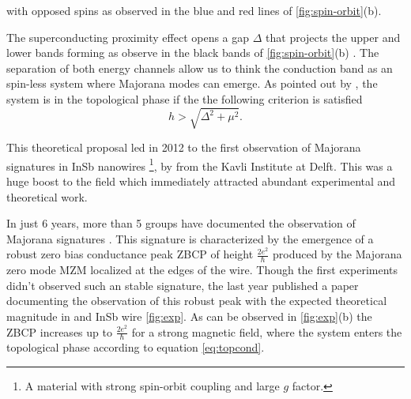 \noindent with opposed spins as observed in the blue and red lines of \ref{fig:spin-orbit}(b).  

The superconducting proximity effect opens a gap $\Delta$ that projects the upper and lower bands forming as observe in the black bands of \ref{fig:spin-orbit}(b) . The separation of both energy channels allow us to think the conduction band as an spin-less system where Majorana modes can emerge. As pointed out by \citeauthor{alicea_new_2012}, the system is in the topological phase if the the following criterion is satisfied 
\begin{equation}
  h > \sqrt{\Delta^2 +\mu^2 }. 
  \label{eq:topcond}
\end{equation}


This theoretical proposal led in 2012 to the first observation of Majorana signatures in InSb nanowires \footnote{A material with strong spin-orbit coupling and large $g$ factor.}, by \citeauthor{mourik_signatures_2012} from the Kavli Institute at Delft. This was a huge boost to the field which immediately attracted abundant experimental and theoretical work. 

In just 6 years, more than 5 groups have documented the observation of Majorana signatures \cite{das_zero-bias_2012,deng_anomalous_2012,nadj-perge_observation_2014,deng_majorana_2016,zhang_quantized_2018}. This signature is characterized by the emergence of a robust zero bias conductance peak ZBCP of height $\frac{2e^2}{\hbar}$ produced by the Majorana zero mode MZM localized at the edges of the wire. Though the first experiments didn't observed such an stable signature, the last year \citeauthor{zhang_quantized_2018} published a paper documenting the observation of this robust peak with the expected theoretical magnitude in and InSb wire \ref{fig:exp}. As can be observed in \ref{fig:exp}(b) the ZBCP increases up to $\frac{2e^2}{\hbar}$ for a strong magnetic field, where the system enters the topological phase according to equation \eqref{eq:topcond}. 



